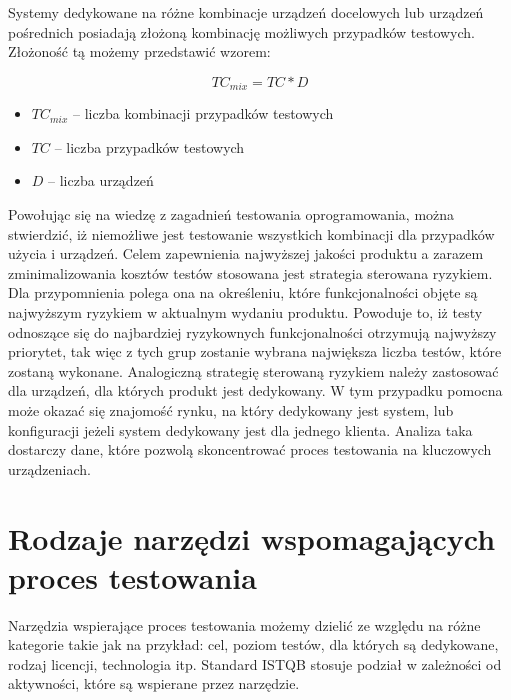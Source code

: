Systemy dedykowane na różne kombinacje urządzeń docelowych lub urządzeń pośrednich posiadają złożoną kombinację możliwych przypadków testowych. Złożoność tą możemy przedstawić wzorem:

\begin{equation}
TC_{mix} = TC * D
\end{equation}
	\begin{itemize}
		\item $TC_{mix}$ -- liczba kombinacji przypadków testowych
		\item $TC$ -- liczba przypadków testowych
		\item $D$ -- liczba urządzeń
	\end{itemize}


Powołując się na wiedzę z zagadnień testowania oprogramowania, można stwierdzić, iż niemożliwe jest testowanie wszystkich kombinacji dla przypadków użycia i urządzeń. Celem zapewnienia najwyższej jakości produktu a zarazem zminimalizowania kosztów testów stosowana jest strategia sterowana ryzykiem. Dla przypomnienia polega ona na określeniu, które funkcjonalności objęte są najwyższym ryzykiem w aktualnym wydaniu produktu. Powoduje to, iż testy odnoszące się do najbardziej ryzykownych funkcjonalności otrzymują najwyższy priorytet, tak więc z tych grup zostanie wybrana największa liczba testów, które zostaną wykonane. Analogiczną strategię sterowaną ryzykiem należy zastosować dla urządzeń, dla których produkt jest dedykowany. W tym przypadku pomocna może okazać się znajomość rynku, na który dedykowany jest system, lub konfiguracji jeżeli system dedykowany jest dla jednego klienta. Analiza taka dostarczy dane, które pozwolą skoncentrować proces testowania na kluczowych urządzeniach. 

\section{Rodzaje narzędzi wspomagających proces testowania}
Narzędzia wspierające proces testowania możemy dzielić ze względu na różne kategorie takie jak na przykład: cel, poziom testów, dla których są dedykowane, rodzaj licencji, technologia itp. Standard ISTQB stosuje podział w zależności od aktywności, które są wspierane przez narzędzie. 

